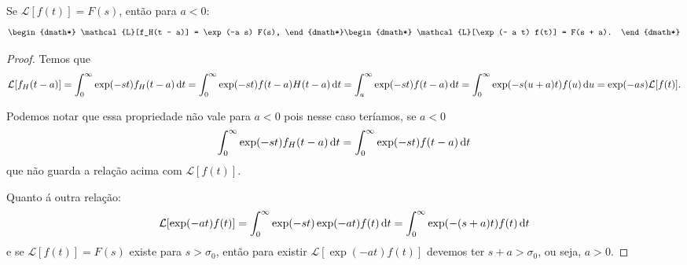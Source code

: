 \begin{lem}[Translação]
  Se $\mathcal{L}[f(t)] = F(s)$, então para $a < 0$:
  \begin{dgroup*}
    \begin{dmath*}
      \mathcal{L}[f_H(t - a)] = \exp(-a s) F(s),
    \end{dmath*}
    \begin{dmath*}
      \mathcal{L}[\exp(- a t) f(t)] = F(s + a).
    \end{dmath*}
  \end{dgroup*}
\end{lem}
\begin{proof}
  Temos que
  \begin{dmath*}
    \mathcal{L}[f_H(t - a)] = \int_0^{\infty} \exp(-s t) f_H(t - a) \vi{t}
    = \int_0^{\infty} \exp(-s t) f(t - a) H(t - a) \vi{t}
    = \int_a^{\infty} \exp(-s t) f(t - a) \vi{t}
    = \int_0^{\infty} \exp(-s (u + a)t) f(u) \vi{u}
    = \exp(-a s) \mathcal{L}[f(t)].
  \end{dmath*}

  Podemos notar que essa propriedade não vale para $a < 0$ pois nesse caso
  teríamos, se $a < 0$
  \begin{dmath*}
    \int_0^{\infty} \exp(-s t) f_H(t - a) \vi{t} = \int_0^{\infty} \exp(-s t)
    f(t - a) \vi{t}
  \end{dmath*}
  que não guarda a relação acima com $\mathcal{L}[f(t)]$.

  Quanto á outra relação:
  \begin{dmath*}
    \mathcal{L}[\exp(-a t) f(t)] = \int_0^{\infty} \exp(-s t) \exp(-a t) f(t)
    \vi{t}
    = \int_0^{\infty} \exp(-(s + a) t) f(t) \vi{t}
  \end{dmath*}
  e se $\mathcal{L}[f(t)] = F(s)$ existe para $s > \sigma_0$, então para existir
  $\mathcal{L}[\exp(-a t) f(t)]$ devemos ter $s + a > \sigma_0$, ou seja, $a >
  0$.
\end{proof}

